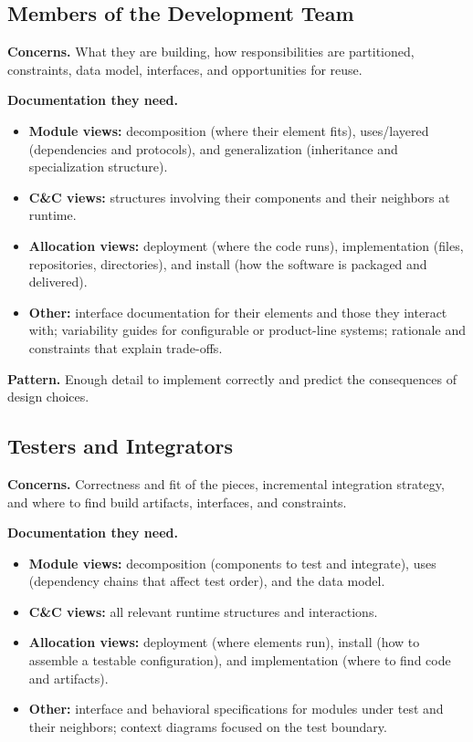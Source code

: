 \documentclass[11pt]{article}
\begin{document}
\subsection{Members of the Development Team}

\textbf{Concerns.} What they are building, how responsibilities are partitioned, constraints, data model, interfaces, and opportunities for reuse.

\medskip
\noindent
\textbf{Documentation they need.}
\begin{itemize}[noitemsep]
  \item \textbf{Module views:} decomposition (where their element fits), uses/layered (dependencies and protocols), and generalization (inheritance and specialization structure).
  \item \textbf{C\&C views:} structures involving their components and their neighbors at runtime.
  \item \textbf{Allocation views:} deployment (where the code runs), implementation (files, repositories, directories), and install (how the software is packaged and delivered).
  \item \textbf{Other:} interface documentation for their elements and those they interact with; variability guides for configurable or product-line systems; rationale and constraints that explain trade-offs.
\end{itemize}

\noindent
\textbf{Pattern.} Enough detail to implement correctly and predict the consequences of design choices.

\subsection{Testers and Integrators}

\textbf{Concerns.} Correctness and fit of the pieces, incremental integration strategy, and where to find build artifacts, interfaces, and constraints.

\medskip
\noindent
\textbf{Documentation they need.}
\begin{itemize}[noitemsep]
  \item \textbf{Module views:} decomposition (components to test and integrate), uses (dependency chains that affect test order), and the data model.
  \item \textbf{C\&C views:} all relevant runtime structures and interactions.
  \item \textbf{Allocation views:} deployment (where elements run), install (how to assemble a testable configuration), and implementation (where to find code and artifacts).
  \item \textbf{Other:} interface and behavioral specifications for modules under test and their neighbors; context diagrams focused on the test boundary.
\end{itemize}
\end{document}
